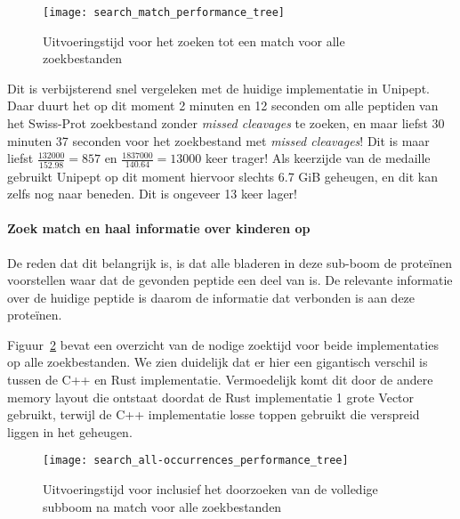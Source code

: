 \begin{figure}[H]
    \centering
    \texttt{[image: search\_match\_performance\_tree]}
    \caption{Uitvoeringstijd voor het zoeken tot een match voor alle zoekbestanden}
    \label{fig:performance_match_tree}
\end{figure}

Dit is verbijsterend snel vergeleken met de huidige implementatie in Unipept.
Daar duurt het op dit moment 2 minuten en 12 seconden om alle peptiden van het Swiss-Prot zoekbestand zonder \textit{missed cleavages} te zoeken,
en maar liefst 30 minuten 37 seconden voor het zoekbestand met \textit{missed cleavages}!
Dit is maar liefst $\frac{132 000}{152.98} = 857$ en $\frac{1 837 000}{140.64} = 13 000$ keer trager!
Als keerzijde van de medaille gebruikt Unipept op dit moment hiervoor slechts 6.7 GiB geheugen, en dit kan zelfs nog naar beneden.
Dit is ongeveer 13 keer lager!

\paragraph{Zoek match en haal informatie over kinderen op}
De reden dat dit belangrijk is, is dat alle bladeren in deze sub-boom de proteïnen voorstellen waar dat de gevonden peptide een deel van is.
De relevante informatie over de huidige peptide is daarom de informatie dat verbonden is aan deze proteïnen. %

Figuur~\ref{fig:performance_all-occurrences_tree} bevat een overzicht van de nodige zoektijd voor beide implementaties op alle zoekbestanden.
We zien duidelijk dat er hier een gigantisch verschil is tussen de C++ en Rust implementatie.
Vermoedelijk komt dit door de andere memory layout die ontstaat doordat de Rust implementatie 1 grote Vector gebruikt, terwijl de C++ implementatie losse toppen gebruikt die verspreid liggen in het geheugen.

\begin{figure}[H]
    \centering
    \texttt{[image: search\_all-occurrences\_performance\_tree]}
    \caption{Uitvoeringstijd voor inclusief het doorzoeken van de volledige subboom na match voor alle zoekbestanden}
    \label{fig:performance_all-occurrences_tree}
\end{figure}


